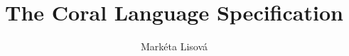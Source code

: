 \documentclass[12pt,a4paper,twoside,titlepage]{book}
\begin{document}
\frontmatter
\title{The Coral Language Specification}
\renewcommand{\docversion}{0.1}
\author{Markéta Lisová}
\maketitle
\clearemptydoublepage
\tableofcontents

\mainmatter
\sloppy



\appendix

\end{document}
